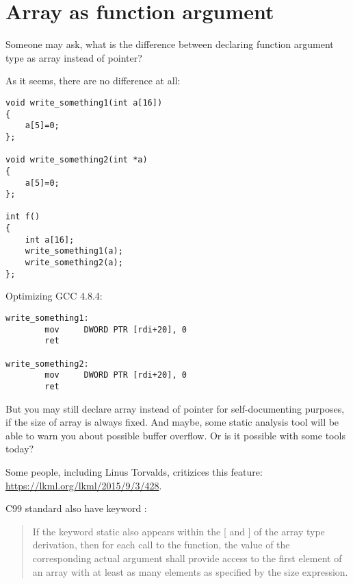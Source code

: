 \section{Array as function argument}

Someone may ask, what is the difference between declaring function argument type as array instead of pointer?

As it seems, there are no difference at all:

\begin{lstlisting}
void write_something1(int a[16])
{
	a[5]=0;
};

void write_something2(int *a)
{
	a[5]=0;
};

int f()
{
	int a[16];
	write_something1(a);
	write_something2(a);
};
\end{lstlisting}

Optimizing GCC 4.8.4:

\begin{lstlisting}
write_something1:
        mov     DWORD PTR [rdi+20], 0
        ret

write_something2:
        mov     DWORD PTR [rdi+20], 0
        ret
\end{lstlisting}

But you may still declare array instead of pointer for self-documenting purposes, if the size of array is always fixed.
And maybe, some static analysis tool will be able to warn you about possible buffer overflow.
Or is it possible with some tools today?

Some people, including Linus Torvalds, critizices this \CCpp feature: \url{https://lkml.org/lkml/2015/9/3/428}.

C99 standard also have  keyword \cite[6.7.5.3]{C99}:

\begin{framed}
\begin{quotation}
If the keyword static also appears  within the [ and ] of the array type derivation, then for each call to the function, the value of the corresponding actual argument shall provide access to the first element of an array with at least as many elements as specified by the size expression.
\end{quotation}
\end{framed}

